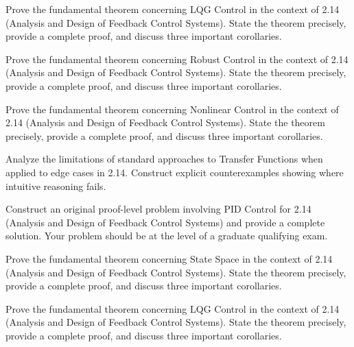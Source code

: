 \documentclass[12pt,a4paper]{exam}
\begin{document}
\begin{questions}
\vspace{0.3cm}

\question[4]
Prove the fundamental theorem concerning LQG Control in the context of 2.14 (Analysis and Design of Feedback Control Systems). State the theorem precisely, provide a complete proof, and discuss three important corollaries.

\vspace{0.3cm}

\question[3]
Prove the fundamental theorem concerning Robust Control in the context of 2.14 (Analysis and Design of Feedback Control Systems). State the theorem precisely, provide a complete proof, and discuss three important corollaries.

\vspace{0.3cm}

\question[7]
Prove the fundamental theorem concerning Nonlinear Control in the context of 2.14 (Analysis and Design of Feedback Control Systems). State the theorem precisely, provide a complete proof, and discuss three important corollaries.

\vspace{0.3cm}

\question[5]
Analyze the limitations of standard approaches to Transfer Functions when applied to edge cases in 2.14. Construct explicit counterexamples showing where intuitive reasoning fails.

\vspace{0.3cm}

\question[5]
Construct an original proof-level problem involving PID Control for 2.14 (Analysis and Design of Feedback Control Systems) and provide a complete solution. Your problem should be at the level of a graduate qualifying exam.

\vspace{0.3cm}

\question[3]
Prove the fundamental theorem concerning State Space in the context of 2.14 (Analysis and Design of Feedback Control Systems). State the theorem precisely, provide a complete proof, and discuss three important corollaries.

\vspace{0.3cm}

\question[5]
Prove the fundamental theorem concerning LQG Control in the context of 2.14 (Analysis and Design of Feedback Control Systems). State the theorem precisely, provide a complete proof, and discuss three important corollaries.

\vspace{0.3cm}


\end{questions}
\end{document}
